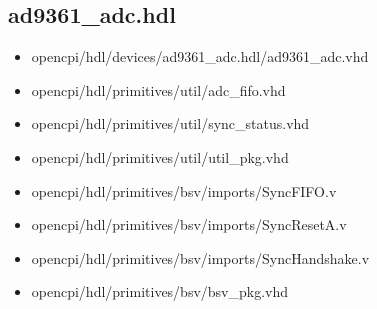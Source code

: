 \documentclass{article}
\def\comp{ad9361\_adc}
\begin{document}
\subsection*{\comp.hdl}
\begin{itemize}
	\item opencpi/hdl/devices/ad9361\_adc.hdl/ad9361\_adc.vhd
	\item opencpi/hdl/primitives/util/adc\_fifo.vhd
	\item opencpi/hdl/primitives/util/sync\_status.vhd
	\item opencpi/hdl/primitives/util/util\_pkg.vhd
	\item opencpi/hdl/primitives/bsv/imports/SyncFIFO.v
	\item opencpi/hdl/primitives/bsv/imports/SyncResetA.v
	\item opencpi/hdl/primitives/bsv/imports/SyncHandshake.v
	\item opencpi/hdl/primitives/bsv/bsv\_pkg.vhd
\end{itemize}
\end{document}
